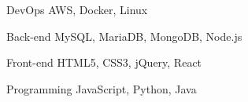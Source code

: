 

\begin{cvskills}

  \cvskill
    {DevOps} %
    {AWS, Docker, Linux} %

  \cvskill
    {Back-end} %
    {MySQL, MariaDB, MongoDB, Node.js} %

  \cvskill
    {Front-end} %
    {HTML5, CSS3, jQuery, React} %

  \cvskill
    {Programming} %
    {JavaScript, Python, Java} %

\end{cvskills}
